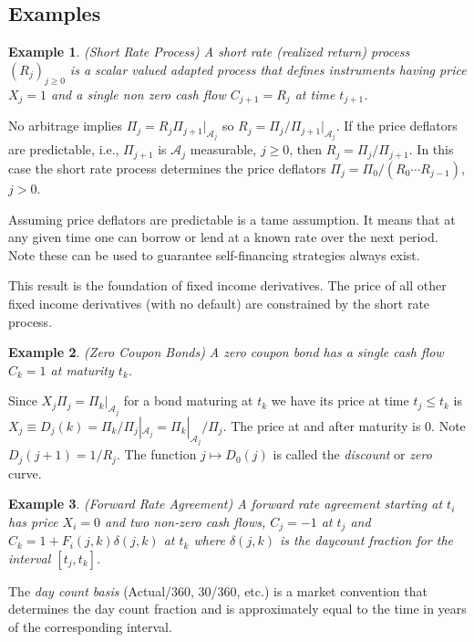 \documentclass[fleqn]{amsart}
\renewcommand{\AA}{\mathcal{A}}
\newtheorem{example}{Example}
\begin{document}
\subsection{Examples}

\begin{example}{(Short Rate Process)}
A {\em short rate (realized return) process} $(R_j)_{j\ge0}$ is a scalar valued adapted process that
defines instruments having price $X_j = 1$ and a single non zero
cash flow $C_{j+1} = R_j$ at time $t_{j+1}$. 
\end{example}
No arbitrage implies $\Pi_j = R_j\Pi_{j+1}|_{\AA_j}$ so $R_j =
\Pi_j/\Pi_{j+1}|_{\AA_j}$.  If the price deflators are predictable,
i.e., $\Pi_{j+1}$ is $\AA_j$ measurable, $j \ge 0$, then $R_j =
\Pi_j/\Pi_{j+1}$. In this case the short rate process determines the
price deflators $\Pi_j = \Pi_0/(R_0\cdots R_{j-1})$, $j>0$.

Assuming price deflators are predictable is a tame assumption.
It means that at any given time one can borrow or lend at a known
rate over the next period. Note these can be used to guarantee
self-financing strategies always exist.

This result is the foundation of fixed income derivatives.
The price of all other fixed income derivatives (with no
default) are constrained by the short rate process. 

\begin{example}{(Zero Coupon Bonds)}
A zero coupon bond has a single cash flow \(C_k = 1\) at maturity \(t_k\).
\end{example}
Since \(X_j\Pi_j = \Pi_k|_{\AA_j}\) for a bond maturing
at \(t_k\) we have its price at time \(t_j \le t_k\) is 
\(X_j \equiv D_j(k) = \Pi_k/\Pi_j|_{\AA_j} = \Pi_k|_{\AA_j}/\Pi_j\).
The price at and after maturity is 0. Note \(D_j(j+1) = 1/R_j\).
The function \(j\mapsto D_0(j)\) is called the
{\em discount} or {\em zero} curve.

\begin{example}{(Forward Rate Agreement)}
A forward rate agreement starting at \(t_i\)
has price \(X_i = 0\) and
two non-zero cash flows,
\(C_j = -1\) at \(t_j\) and \(C_k = 1 + F_i(j,k)\delta(j,k)\) at \(t_k\)
where \(\delta(j,k)\) is the {\em daycount fraction} for the
interval \([t_j,t_k]\).
\end{example}
The {\em day count basis} (Actual/360, 30/360, etc.) is a market convention
that determines the day count fraction and is approximately equal to the time
in years of the corresponding interval.
\end{document}
